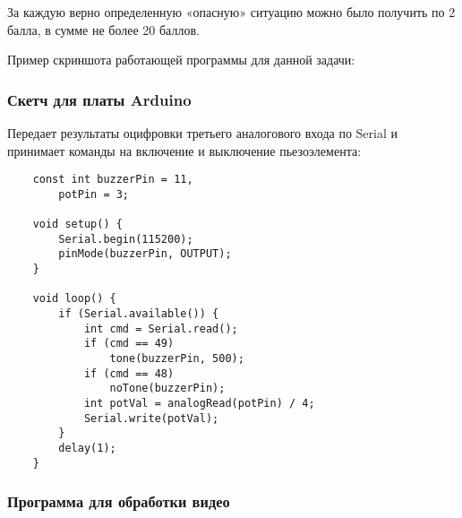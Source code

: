 За каждую верно определенную «опасную» ситуацию можно было получить по 2 балла, в сумме не более 20 баллов.

Пример скриншота работающей программы для данной задачи:


\subsubsection*{Скетч для платы Arduino}

Передает результаты оцифровки третьего аналогового входа по Serial и принимает команды на включение и выключение пьезоэлемента: 

\begin{verbatim}
    const int buzzerPin = 11,
      	potPin = 3;

    void setup() {
        Serial.begin(115200);
        pinMode(buzzerPin, OUTPUT);
    }

    void loop() {
        if (Serial.available()) {
            int cmd = Serial.read();
            if (cmd == 49)
                tone(buzzerPin, 500);
            if (cmd == 48)
                noTone(buzzerPin);
            int potVal = analogRead(potPin) / 4;
            Serial.write(potVal);
        }
        delay(1);
    }
\end{verbatim}

\subsubsection*{Программа для обработки видео}


